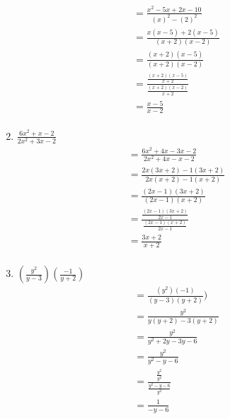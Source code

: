 \documentclass{article}
\begin{document}
\begin{description}
\begin{enumerate}
                  \begin{equation}
                      \begin{split}
                          & = \frac{x^2 -5x + 2x - 10}{(x)^2-(2)^2}\\
                          & = \frac{x(x-5)+2(x-5)}{(x+2)(x-2)} \\
                          & = \frac{(x+2)(x-5)}{(x+2)(x-2)}\\
                          & = \frac{\frac{(x+2)(x-5)}{x+2}} {\frac{(x+2)(x-2)}{x+2}}\\
                          & = \frac{x-5}{x-2}\\
                      \end{split}
                  \end{equation}
            \item $\frac{6x^2 + x - 2}{2x^2 + 3x - 2}$
                  \begin{equation}
                      \begin{split}
                          & = \frac{6x^2+4x-3x-2}{2x^2+4x-x-2}\\
                          & = \frac{2x(3x+2)-1(3x+2)}{2x(x+2)-1(x+2)} \\
                          & = \frac{(2x-1)(3x+2)}{(2x-1)(x+2)}\\
                          & = \frac{\frac{(2x-1)(3x+2)}{2x-1}}{\frac{(2x-1)(x+2)}{2x-1}}\\
                          & = \frac{3x+2}{x+2}\\
                      \end{split}
                  \end{equation}
            \item $(\frac{y^2}{y-3})(\frac{-1}{y+2})$
                  \begin{equation}
                      \begin{split}
                          & = \frac{(y^2)(-1)}{(y-3)(y+2)})\\
                          & = \frac{y^2}{y(y+2)-3(y+2)}\\
                          & = \frac{y^2}{y^2+2y-3y-6}\\
                          & = \frac{y^2}{y^2-y-6}\\
                          & = \frac{\frac{y^2}{y^2}}{\frac{y^2-y-6}{y^2}}\\
                          & = \frac{1}{-y-6}
                      \end{split}

\end{equation}
\end{enumerate}
\end{description}
\end{document}
